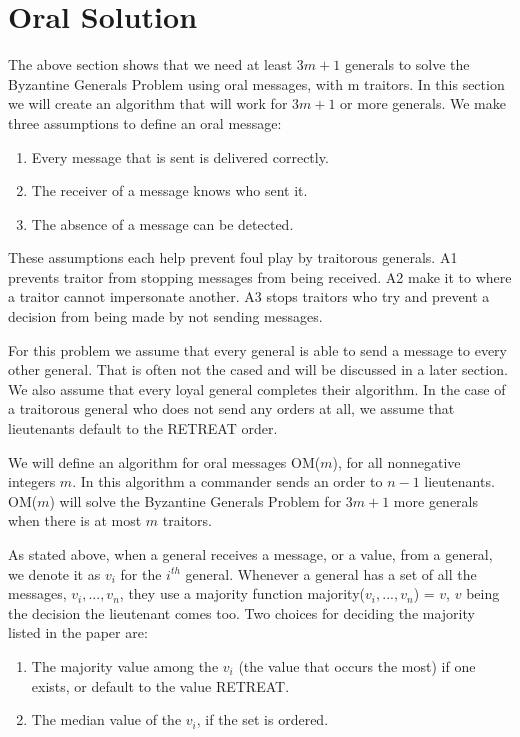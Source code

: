 \documentclass[10pt]{amsart}
\begin{document}
\section{Oral Solution}

The above section shows that we need at least $3m+1$ generals to solve the Byzantine Generals Problem
using oral messages, with m traitors.  In this section we will create an algorithm that will work for
$3m+1$ or more generals. We make three assumptions to define an oral message:
\begin{enumerate}[label={A\arabic{enumi}.}]
    \item Every message that is sent is delivered correctly.
    \item The receiver of a message knows who sent it.
    \item The absence of a message can be detected.
\end{enumerate}

These assumptions each help prevent foul play by traitorous generals. A1 prevents traitor from
stopping messages from being received. A2 make it to where a traitor cannot impersonate another.
A3 stops traitors who try and prevent a decision from being made by not sending messages.

For this problem we assume that every general is able to send a message to every other general. That
is often not the cased and will be discussed in a later section. We also assume that every loyal 
general completes their algorithm. In the case of a traitorous general who does not send any orders
at all, we assume that lieutenants default to the RETREAT order.

We will define an algorithm for oral messages OM($m$), for all nonnegative integers $m$. In this algorithm
a commander sends an order to $n-1$ lieutenants. OM($m$) will solve the Byzantine Generals Problem for
$3m+1$ more generals when there is at most $m$ traitors.

As stated above, when a general receives a message, or a value, from a general, we denote it as $v_i$
for the $i^{th}$ general. Whenever a general has a set of all the messages, $v_i,...,v_n$, they use a 
majority function majority($v_i,...,v_n$) = $v$, $v$ being the decision the lieutenant comes too. Two choices 
for deciding the majority listed in the paper are:
\begin{enumerate}[label={\arabic{enumi}.}]
    \item {
        The majority value among the $v_i$ (the value that occurs the most) if one exists, or default 
        to the value RETREAT.
    }
    \item The median value of the $v_i$, if the set is ordered.
\end{enumerate}
\end{document}
